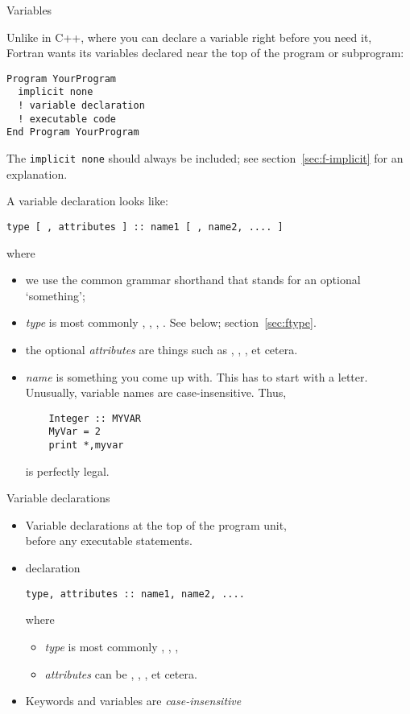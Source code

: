 {Variables}

Unlike in C++, where you can declare a variable right before you need
it, Fortran wants its variables declared near the top of the program
or subprogram:
\begin{lstlisting}
Program YourProgram
  implicit none
  ! variable declaration
  ! executable code
End Program YourProgram
\end{lstlisting}
The \lstinline{implicit none} should always be included;
see section~\ref{sec:f-implicit} for an explanation.

A variable declaration looks like:
\begin{lstlisting}
type [ , attributes ] :: name1 [ , name2, .... ]
\end{lstlisting}
where
\begin{itemize}
\item we use the common grammar shorthand that \n{[ something ]}
  stands for an optional `something';
\item \textit{type} is most commonly , , ,
  . See below; section~\ref{sec:ftype}.
\item the optional \textit{attributes} are things such as
  , ,
  ,  et cetera.
\item \textit{name} is something you come up with. This has to start
  with a letter. Unusually, variable names are case-insensitive.
  Thus, 
  \begin{lstlisting}
    Integer :: MYVAR
    MyVar = 2
    print *,myvar
  \end{lstlisting}
  is perfectly legal.
\end{itemize}

\begin{slide}{Variable declarations}
  \label{sl:fvars}
  \begin{itemize}
  \item Variable declarations at the top of the program unit,\\
    before any executable statements.
  \item declaration
\begin{lstlisting}
type, attributes :: name1, name2, ....
\end{lstlisting}
where
\begin{itemize}
\item \textit{type} is most commonly ,
  , ,
\item \textit{attributes} can be ,
  , ,
   et cetera.
\end{itemize}
\item Keywords and variables are
  \emph{case-insensitive}
\end{itemize}
\end{slide}

